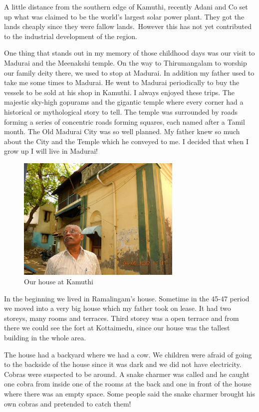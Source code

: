 A little distance from the southern edge of Kamuthi, recently Adani and 
Co set up what was claimed to be the world's largest solar power plant. 
They got the lands cheaply since they were fallow lands.\ However this 
has not yet contributed to the industrial development of the region.

One thing that stands out in my memory of those childhood days was our 
visit to Madurai and the Meenakshi temple. On the way to Thirumangalam 
to worship our family deity there, we used to stop at Madurai. In 
addition my father used to take me some times to Madurai. He went to 
Madurai periodically to buy the vessels to be sold at his shop in 
Kamuthi. I always enjoyed these trips. The majestic sky-high gopurams 
and the giga\-ntic temple where every corner had a historical or 
mythological story to tell. The temple was surrounded by roads for\-ming a 
series of concentric roads forming squares, each named after a Tamil 
month. The Old Madurai City was so well planned. My father knew so much 
about the City and the Temple which he conveyed to me. I decided that 
when I grow up I will live in Madurai!

\begin{figure}[h]
\centering
\includegraphics[width=0.7\textwidth]{images/new-images/02-Rajaji-home.jpg}
\caption{Our house at Kamuthi}
\end{figure}
\vspace{-\topsep}

In the beginning we lived in Ramalingam's house. Sometime in the 45-47 
period we moved into a very big house which my father took on lease. It 
had two storeys, many rooms and terraces. Third storey was a open 
terrace and from there we could see the fort at Kottaimedu, since our 
house was the tallest building in the whole area.

The house had a backyard where we had a cow. We children were afraid of 
going to the backside of the house since it was dark and we did not have 
electricity. Cobras were suspected to be around. A snake charmer was 
called and he caught one cobra from inside one of the rooms at the back 
and one in front of the house where there was an empty space. Some 
people said the snake charmer brought his own cobras and pretended to 
catch them!

